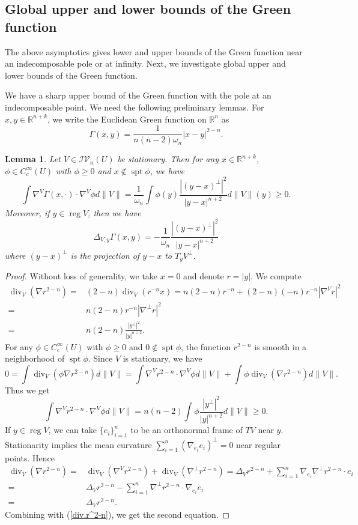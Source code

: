 \documentclass[11pt]{amsart}
\newtheorem{lemma}[theorem]{Lemma}
\theoremstyle{definition}
\newcommand{\R}{\mathbb{R}}
\newcommand{\IV}{\mathcal{IV}}
\DeclareMathOperator{\spt}{spt}
\DeclareMathOperator{\reg}{reg}
\DeclareMathOperator{\Div}{div}
\begin{document}
\subsection{Global upper and lower bounds of the Green function}
The above asymptotics gives lower and upper bounds of the Green function near an indecomposable pole or at infinity. Next, we investigate global upper and lower bounds of the Green function.

We have a sharp upper bound of the Green function with the pole at an indecomposable point. We need the following preliminary lemmas.
For $x,y\in \R^{n+k}$, we write the Euclidean Green function on $\R^n$ as
\[\Gamma(x,y)=\frac{1}{n(n-2)\omega_n}|x-y|^{2-n}.\]
\begin{lemma}\label{super}
	Let $V\in \IV_n(U)$ be stationary. Then for any $x\in \R^{n+k}$, $\phi\in C_c^\infty(U)$ with $\phi\ge0$ and $x\notin \spt \phi$, we have
	\[\int \nabla^V\Gamma(x,\cdot)\cdot \nabla^V\phi d\|V\|=\frac{1}{\omega_n}\int \phi (y)\frac{|(y-x)^\perp|^2}{|y-x|^{n+2}}d\|V\|(y)\ge0. \]
	 Moreover, if $y\in\reg V$, then we have
	 \[\Delta_{V,y} \Gamma(x,y)=-\frac{1}{\omega_n}\frac{|(y-x)^\perp|^2}{|y-x|^{n+2}}\]
	where $(y-x)^{\perp}$ is the projection of $y-x$ to $T_yV^\perp$.
\end{lemma}
\begin{proof}
	Without loss of generality, we take $x=0$ and denote $r=|y|$. We compute
	\begin{equation}\label{div.r^2-n}
		\begin{aligned}
			\Div _V(\nabla r^{2-n})=&(2-n)\Div _V(r^{-n}x)=n(2-n)r^{-n}+(2-n)(-n)r^{-n}|\nabla ^Vr|^2\\
			=&n(2-n)r^{-n}|\nabla^\perp r|^2\\
			=&n(2-n)\frac{|y^\perp|^2}{|y|^{n+2}}.
		\end{aligned}
	\end{equation}
	For any $\phi\in C_c^\infty(U)$ with $\phi\ge0$ and $0\notin \spt \phi$, the function $r^{2-n}$ is smooth in a neighborhood of $\spt\phi$. Since $V$ is stationary, we have
	\[0=\int \Div _V(\phi\nabla r^{2-n})d\|V\|=\int \nabla^V r^{2-n}\cdot\nabla^V\phi d\|V\|+\int \phi \Div_V (\nabla r^{2-n})d\|V\|.\]
	Thus we get
	\[\int \nabla^V r^{2-n}\cdot\nabla^V\phi d\|V\|=n(n-2)\int \phi \frac{|y^\perp|^2}{|y|^{n+2}}d\|V\|\ge0.\]
	If $y\in \reg V$, we can take $\{e_i\}_{i=1}^n$ to be an orthonormal frame of $TV$ near $y$. Stationarity implies the mean curvature $\sum_{i=1}^n(\nabla_{e_i}e_i)^\perp=0$ near regular points. Hence
	\[\begin{aligned}
		\Div _V(\nabla r^{2-n})=&\Div _V(\nabla^V r^{2-n})+\Div _V(\nabla^\perp r^{2-n})=\Delta_Vr^{2-n}+\sum_{i=1}^n \nabla_{e_i}\nabla^\perp r^{2-n}\cdot e_i\\
		=&\Delta_Vr^{2-n}-\sum_{i=1}^n \nabla^\perp r^{2-n}\cdot \nabla_{e_i}e_i\\
		=&\Delta_Vr^{2-n}.
	\end{aligned}\]
	Combining with (\ref{div.r^2-n}), we get the second equation.
\end{proof}
\end{document}

